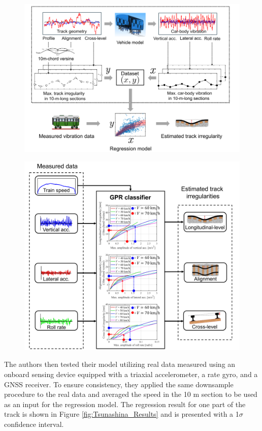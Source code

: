 \begin{figure}[H]
    \centering
    \includegraphics[width=12cm]{Cap2_LitReview/Track_Quality_Accel/Tsunashina (2024)/data-process.png}
    \caption{\cite{vibration7040049}}
    \label{fig:Tsunashina_data_process}
\end{figure}

\begin{figure}[H]
    \centering
    \includegraphics[width=12cm]{Cap2_LitReview/Track_Quality_Accel/Tsunashina (2024)/gpr.png}
    \caption{\cite{vibration7040049}}
    \label{fig:Tsunashina_GPR}
\end{figure}

The authors then tested their model utilizing real data measured using an onboard sensing device equipped with a triaxial accelerometer, a rate gyro, and a GNSS receiver. To ensure consistency, they applied the same downsample procedure to the real data and averaged the speed in the 10 m section to be used as an input for the regression model. The regression result for one part of the track is shown in Figure \ref{fig:Tsunashina_Results} and is presented with a 1$\sigma$ confidence interval. 

